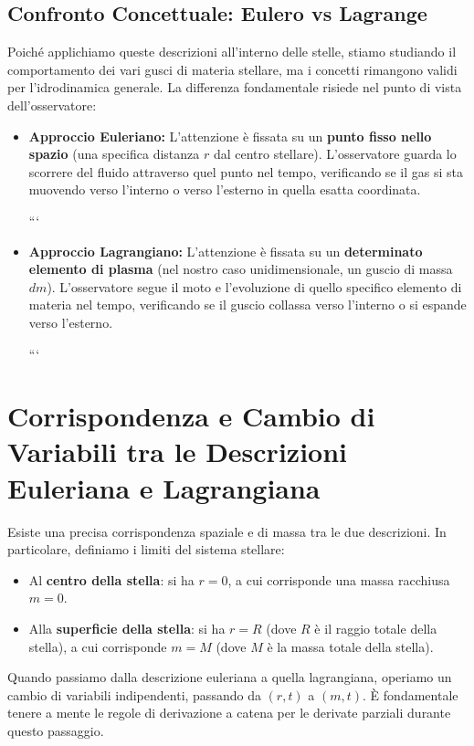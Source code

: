 \subsection{Confronto Concettuale: Eulero vs Lagrange}

Poiché applichiamo queste descrizioni all'interno delle stelle, stiamo studiando il comportamento dei vari gusci di materia stellare, ma i concetti rimangono validi per l'idrodinamica generale. La differenza fondamentale risiede nel punto di vista dell'osservatore:

\begin{itemize}
\item \textbf{Approccio Euleriano:} L'attenzione è fissata su un \textbf{punto fisso nello spazio} (una specifica distanza $r$ dal centro stellare). L'osservatore guarda lo scorrere del fluido attraverso quel punto nel tempo, verificando se il gas si sta muovendo verso l'interno o verso l'esterno in quella esatta coordinata.

```
\item \textbf{Approccio Lagrangiano:} L'attenzione è fissata su un \textbf{determinato elemento di plasma} (nel nostro caso unidimensionale, un guscio di massa $dm$). L'osservatore segue il moto e l'evoluzione di quello specifico elemento di materia nel tempo, verificando se il guscio collassa verso l'interno o si espande verso l'esterno.

```

\end{itemize}

\section{Corrispondenza e Cambio di Variabili tra le Descrizioni Euleriana e Lagrangiana}

Esiste una precisa corrispondenza spaziale e di massa tra le due descrizioni. In particolare, definiamo i limiti del sistema stellare:
\begin{itemize}
\item Al \textbf{centro della stella}: si ha $r = 0$, a cui corrisponde una massa racchiusa $m = 0$.
\item Alla \textbf{superficie della stella}: si ha $r = R$ (dove $R$ è il raggio totale della stella), a cui corrisponde $m = M$ (dove $M$ è la massa totale della stella).
\end{itemize}

Quando passiamo dalla descrizione euleriana a quella lagrangiana, operiamo un cambio di variabili indipendenti, passando da $(r, t)$ a $(m, t)$. È fondamentale tenere a mente le regole di derivazione a catena per le derivate parziali durante questo passaggio.

